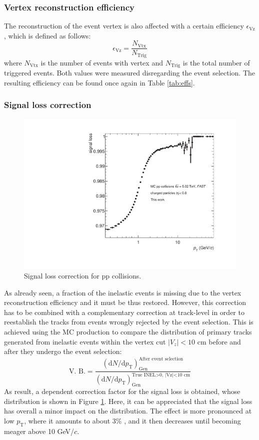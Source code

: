 \documentclass[12pt,a4paper]{report}
\begin{document}
\subsubsection{Vertex reconstruction efficiency}
The reconstruction of the event vertex is also affected with a certain efficiency $\epsilon_\text{Vz}$, which is defined as follows:
\begin{equation}
\epsilon_\text{Vz} = \dfrac{N_\text{Vtx}}{N_\text{Trig}} 
\end{equation}
where $N_\text{Vtx}$ is the number of events with vertex and $N_\text{Trig}$ is the total number of triggered events. Both values were measured disregarding the event selection. The resulting efficiency can be found once again in Table \ref{tab:effs}.
\subsubsection{Signal loss correction}
\begin{figure}[tb!]
\centering
\includegraphics[width=12cm]{Plots/signalLossFAST.pdf}  
\caption{Signal loss correction for pp collisions.}
\label{sigLoss}
\end{figure}
As already seen, a fraction of the inelastic events is missing due to the vertex reconstruction efficiency and it must be thus restored. However, this correction has to be combined with a complementary correction at track-level in order to reestablish the tracks from events wrongly rejected by the event selection. This is achieved using the MC production to compare the distribution of primary tracks generated from inelastic events within the vertex cut $|V_z| < 10$ cm before and after they undergo the event selection:
\begin{equation}
\text{V. B.} = \dfrac{(\text{d}N/\text{d}p_\text{T})_\text{Gen}^\text{After event selection}}{(\text{d}N/\text{d}p_\text{T})_\text{Gen}^\text{True INEL>0, |Vz|<10 cm}}
\end{equation}
As result, a \pt dependent correction factor for the signal loss is obtained, whose distribution is shown in Figure \ref{sigLoss}. Here, it can be appreciated that the signal loss has overall a minor impact on the \pt distribution. The effect is more pronounced at low $p_\text{T}$, where it amounts to about 3\% , and it then decreases until becoming meager above 10 GeV/$c$.
\end{document}
